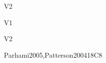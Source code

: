 \begin{syllabus}
\begin{outcomes}{V2}
    \item {}
    \item {}
\end{outcomes}

\begin{competences}{V1}
    \item {} 
    \item {}
    \item {}
\end{competences}

\begin{competences}{V2}
    \item {} 
    \item {}
    \item {}
\end{competences}

\begin{unit}{\ARDigitallogicanddigitalsystems}{}{Parhami2005,Patterson2004}{18}{C8}
\begin{topics}%
\item \ARDigitallogicanddigitalsystemsTopicOverview
\item \ARDigitallogicanddigitalsystemsTopicCombinational
\item \ARDigitallogicanddigitalsystemsTopicMultiple
\item \ARDigitallogicanddigitalsystemsTopicComputer
\item \ARDigitallogicanddigitalsystemsTopicRegister
\item \ARDigitallogicanddigitalsystemsTopicPhysical
\end{topics}
\begin{learningoutcomes}
\item \ARDigitallogicanddigitalsystemsLODescribeTheComputer [\Familiarity]
\item \ARDigitallogicanddigitalsystemsLOComprehend [\Usage]
\item \ARDigitallogicanddigitalsystemsLOExplainTheThe [\Usage]
\item \ARDigitallogicanddigitalsystemsLOArticulate [\Familiarity]
\item \ARDigitallogicanddigitalsystemsLODesignThe [\Usage]
\item \ARDigitallogicanddigitalsystemsLOUseCad [\Familiarity]
\item \ARDigitallogicanddigitalsystemsLOEvaluate [\Assessment]
\end{learningoutcomes}
\end{unit}


\end{syllabus}
